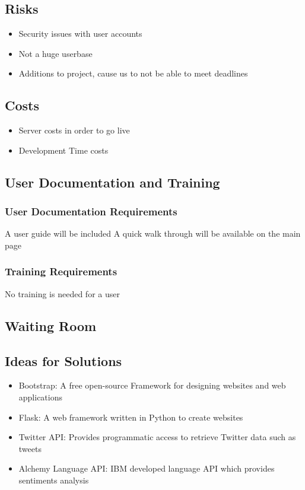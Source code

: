 \documentclass[12pt]{article}
\begin{document}
\subsection{Risks} 
\begin{itemize}
\item Security issues with user accounts
\item Not a huge userbase
\item Additions to project, cause us to not be able to meet deadlines
\end{itemize}


\subsection{Costs} 
\begin{itemize}
\item Server costs in order to go live
\item Development Time costs
\end{itemize}

\subsection{User Documentation and Training} 
\subsubsection{User Documentation Requirements}
A user guide will be included
A quick walk through will be available on the main page

\subsubsection{Training Requirements}
No training is needed for a user

\subsection{Waiting Room} 


\subsection{Ideas for Solutions} 
\begin{itemize}
\item Bootstrap: A free open-source Framework for designing websites and web applications
\item Flask: A web framework written in Python to create websites
\item Twitter API: Provides programmatic access to retrieve Twitter data such as tweets
\item Alchemy Language API: IBM developed language API which provides sentiments analysis
\end{itemize}
\end{document}
